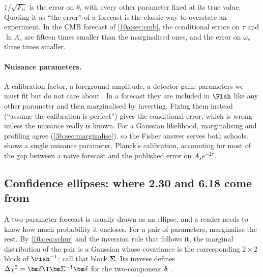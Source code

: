 \begin{pitfall}
$1/\sqrt{F_{ii}}$ is the error on $\theta_i$ with every other parameter fixed at its true value. Quoting it as
``the error'' of a forecast is the classic way to overstate an experiment. In the CMB forecast of
\cref{10a:sec:cmb}, the conditional errors on $\tau$ and $\ln A_s$ are fifteen times smaller than the
marginalised ones, and the error on $\omega_c$ three times smaller.
\end{pitfall}

\paragraph{Nuisance parameters.} A calibration factor, a foreground amplitude, a detector gain: parameters we
must fit but do not care about \cite{Heavens2009}. In a forecast they are included in $\Fish$ like any other
parameter and then marginalised by inverting. Fixing them instead (``assume the calibration is perfect'')
gives the conditional error, which is wrong unless the nuisance really is known. For a Gaussian likelihood,
marginalising and profiling agree (\cref{3b:sec:marginalise}), so the Fisher answer serves both schools.
 shows a single nuisance parameter, Planck's calibration, accounting for most of the
gap between a naive forecast and the published error on $A_se^{-2\tau}$.

\subsection{Confidence ellipses: where 2.30 and 6.18 come from}
\label{10a:sec:ellipses}

A two-parameter forecast is usually drawn as an ellipse, and a reader needs to know how much probability it
encloses. For a pair of parameters, marginalise the rest. By \eqref{10a:eq:schur} and the inversion rule
that follows it, the marginal distribution of the pair is a Gaussian whose covariance is the corresponding
$2\times2$ block of $\Fish^{-1}$; call that block $\bm\Sigma$. Its inverse defines
$\Delta\chi^2=\bm\delta\T\bm\Sigma^{-1}\bm\delta$ for the two-component $\bm\delta$ .

